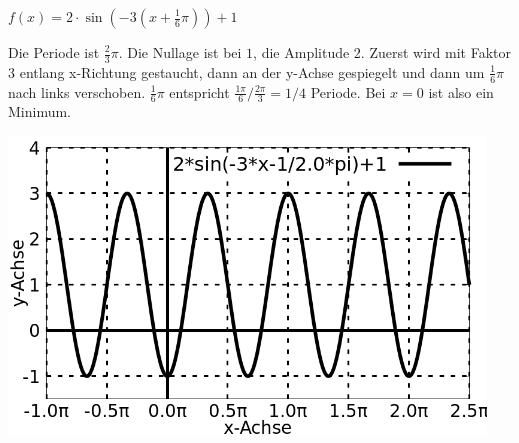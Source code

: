 \item $f(x) = 2\cdot\sin\left(-3(x+\frac{1}{6}\pi)\right)+1$

Die Periode ist $\frac{2}{3}\pi$. Die Nullage ist bei $1$, die Amplitude $2$. Zuerst wird mit Faktor $3$ entlang x-Richtung gestaucht, dann an der y-Achse gespiegelt und dann um $\frac{1}{6}\pi$ nach links verschoben. $\frac{1}{6}\pi$ entspricht $\frac{1\pi}{6} / \frac{2\pi}{3} = 1/4$ Periode. Bei $x=0$ ist also ein Minimum.

\begin{center}
  \includegraphics[width=0.95\textwidth]{../pool/ex-fn-transform-5-a.png}
\end{center}

